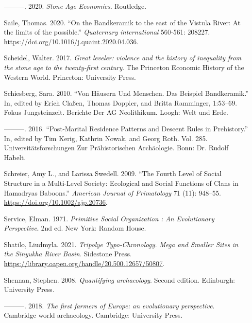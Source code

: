 \documentclass[
  12pt,
  a4paper, twoside]{book}
\newlength{\cslhangindent}
\newlength{\cslentryspacingunit} %
\newenvironment{CSLReferences}[2] %
 {%
  \setlength{\parindent}{0pt}
  \ifodd #1
  \let\oldpar\par
  \def\par{\hangindent=\cslhangindent\oldpar}
  \fi
  \setlength{\parskip}{#2\cslentryspacingunit}
 }%
 {}
\begin{document}
\begin{CSLReferences}{1}{0}
\leavevmode{}%
---------. 2020. \emph{Stone Age Economics}. Routledge.

\leavevmode{}%
Saile, Thomas. 2020. {``On the Bandkeramik to the east of the Vistula River: At the limits of the possible.''} \emph{Quaternary international} 560-561: 208227. \url{https://doi.org/10.1016/j.quaint.2020.04.036}.

\leavevmode{}%
Scheidel, Walter. 2017. \emph{Great leveler: violence and the history of inequality from the stone age to the twenty-first century}. The Princeton Economic History of the Western World. Princeton: University Press.

\leavevmode{}%
Schiesberg, Sara. 2010. {``Von Häusern Und Menschen. Das Beispiel Bandkeramik.''} In, edited by Erich Claßen, Thomas Doppler, and Britta Ramminger, 1:53--69. Fokus Jungsteinzeit. Berichte Der AG Neolithikum. Loogh: Welt und Erde.

\leavevmode{}%
---------. 2016. {``Post-Marital Residence Patterns and Descent Rules in Prehistory.''} In, edited by Tim Kerig, Kathrin Nowak, and Georg Roth. Vol. 285. Universitätsforschungen Zur Prähistorischen Archäologie. Bonn: Dr. Rudolf Habelt.

\leavevmode{}%
Schreier, Amy L., and Larissa Swedell. 2009. {``The Fourth Level of Social Structure in a Multi-Level Society: Ecological and Social Functions of Clans in Hamadryas Baboons.''} \emph{American Journal of Primatology} 71 (11): 948--55. \url{https://doi.org/10.1002/ajp.20736}.

\leavevmode{}%
Service, Elman. 1971. \emph{Primitive Social Organization : An Evolutionary Perspective}. 2nd ed. New York: Random House.

\leavevmode{}%
Shatilo, Liudmyla. 2021. \emph{Tripolye Typo-Chronology. Mega and Smaller Sites in the Sinyukha River Basin}. Sidestone Press. \url{https://library.oapen.org/handle/20.500.12657/50807}.

\leavevmode{}%
Shennan, Stephen. 2008. \emph{Quantifying archaeology}. Second edition. Edinburgh: University Press.

\leavevmode{}%
---------. 2018. \emph{The first farmers of Europe: an evolutionary perspective}. Cambridge world archaeology. Cambridge: University Press.


\end{CSLReferences}
\end{document}
